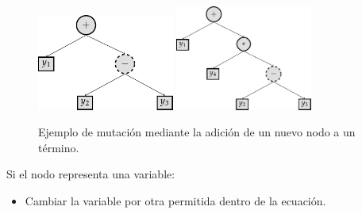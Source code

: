 \begin{itemize}
\begin{itemize}
\begin{center}
                        \begin{figure}[h]
                            \centering
                            \includegraphics[width=0.4\textwidth]{"figures/mutation_add_operation_1.pdf"}
                            \qquad
                            \includegraphics[width=0.4\textwidth]{"figures/mutation_add_operation_2.pdf"}
                            \caption{Ejemplo de mutación mediante la adición de un nuevo nodo a un término.}
                            \label{tikzpicture:mutation_add_operation}
                        \end{figure}
                    \end{center}

          \end{itemize}

          Si el nodo representa una variable:

          \begin{itemize}
              \item Cambiar la variable por otra permitida dentro de la ecuación.


\end{itemize}
\end{itemize}
